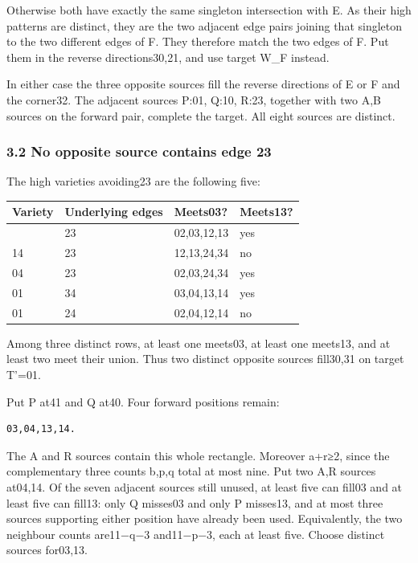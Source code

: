 \documentclass[
  10pt,
]{article}
\begin{document}
Otherwise both have exactly the same singleton intersection with E. As
their high patterns are distinct, they are the two adjacent edge pairs
joining that singleton to the two different edges of F. They therefore
match the two edges of F. Put them in the reverse directions30,21, and
use target W\_F instead.

In either case the three opposite sources fill the reverse directions of
E or F and the corner32. The adjacent sources P:01, Q:10, R:23, together
with two A,B sources on the forward pair, complete the target. All eight
sources are distinct.

\hypertarget{no-opposite-source-contains-edge-23}{%
\subsubsection*{3.2 No opposite source contains edge
23}\label{no-opposite-source-contains-edge-23}}

The high varieties avoiding23 are the following five:

\begin{longtable}[]{@{}llll@{}}
\toprule\noalign{}
Variety & Underlying edges & Meets03? & Meets13? \\
\midrule\noalign{}
\endhead
\bottomrule\noalign{}
\endlastfoot
01 & 23 & 02,03,12,13 & yes \\
14 & 23 & 12,13,24,34 & no \\
04 & 23 & 02,03,24,34 & yes \\
01 & 34 & 03,04,13,14 & yes \\
01 & 24 & 02,04,12,14 & no \\
\end{longtable}

Among three distinct rows, at least one meets03, at least one meets13,
and at least two meet their union. Thus two distinct opposite sources
fill30,31 on target T'=01.

Put P at41 and Q at40. Four forward positions remain:

\begin{verbatim}
03,04,13,14.
\end{verbatim}

The A and R sources contain this whole rectangle. Moreover a+r≥2, since
the complementary three counts b,p,q total at most nine. Put two A,R
sources at04,14. Of the seven adjacent sources still unused, at least
five can fill03 and at least five can fill13: only Q misses03 and only P
misses13, and at most three sources supporting either position have
already been used. Equivalently, the two neighbour counts are11−q−3
and11−p−3, each at least five. Choose distinct sources for03,13.
\end{document}
